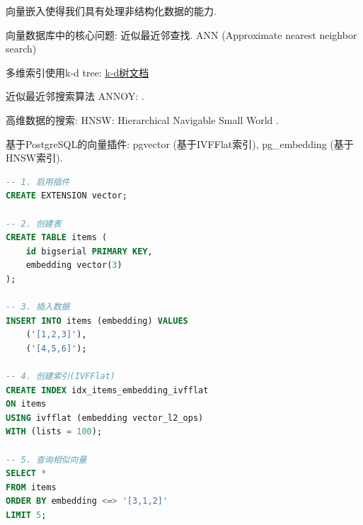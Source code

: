 向量嵌入使得我们具有处理非结构化数据的能力.

向量数据库中的核心问题: 近似最近邻查找. ANN (Approximate nearest neighbor search)

多维索引使用k-d tree: \href{https://oi-wiki.org/ds/kdt/}{k-d树文档}

近似最近邻搜索算法 ANNOY: \cite{liApproximateNearestNeighbor2016}.

高维数据的搜索: HNSW: Hierarchical Navigable Small World \cite{malkovEfficientRobustApproximate2018}.

基于PostgreSQL的向量插件: pgvector (基于IVFFlat索引), pg\_embedding (基于HNSW索引).
\begin{lstlisting}[language=SQL]
-- 1. 启用插件
CREATE EXTENSION vector;

-- 2. 创建表
CREATE TABLE items (
    id bigserial PRIMARY KEY,
    embedding vector(3)
);

-- 3. 插入数据
INSERT INTO items (embedding) VALUES
    ('[1,2,3]'),
    ('[4,5,6]');

-- 4. 创建索引(IVFFlat)
CREATE INDEX idx_items_embedding_ivfflat 
ON items 
USING ivfflat (embedding vector_l2_ops) 
WITH (lists = 100);

-- 5. 查询相似向量
SELECT * 
FROM items 
ORDER BY embedding <=> '[3,1,2]' 
LIMIT 5;
\end{lstlisting}